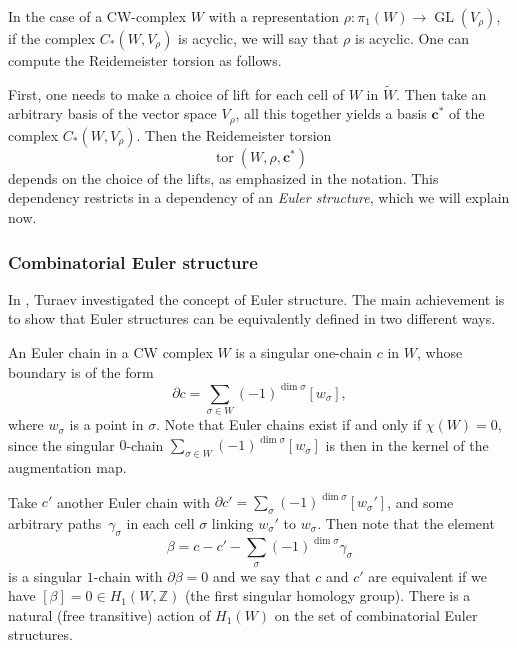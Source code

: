 \documentclass[JEP,XML,SOM,Unicode,NoFloatCountersInSection,published]{cedram}
\theoremstyle{plain}
\theoremstyle{definition}
\theoremstyle{remark}
\newcommand{\Z}{\mathbb{Z}}
\DeclareMathOperator{\GL}{GL}
\numberwithin{equation}{section}
\DeclareMathOperator{\tor}{tor}
\begin{document}
In the case of a CW-complex $W$ with a representation $\rho \colon \pi_1(W) \to \GL(V_\rho)$, if the complex $C_*(W, V_\rho)$ is acyclic, we will say that $\rho$ is acyclic. One can compute the Reidemeister torsion as follows.\par
First, one needs to make a choice of lift for each cell of $W$ in $\widetilde W$. Then take an arbitrary basis of the vector space $V_\rho$, all this together yields a basis $\boldsymbol c^\ast$ of the complex $C_*(W, V_\rho)$. Then the Reidemeister torsion
\[
\tor(W, \rho, \boldsymbol c^*)
\]
depends on the choice of the lifts, as emphasized in the notation. This dependency restricts in a dependency of an \emph{Euler structure}, which we will explain now.

\label{subsec:Euler}
\subsubsection{Combinatorial Euler structure}
In \cite{Turaev}, Turaev investigated the concept of Euler structure. The main achievement is to show that Euler structures can be equivalently defined in two different ways.

An Euler chain in a CW complex $W$ is a singular one-chain $c$ in $W$, whose boundary is of the form
\[
\partial c = \sum_{\sigma \in W} (-1)^{\dim \sigma} [w_\sigma],
\]
where $w_\sigma$ is a point in $\sigma$. Note that Euler chains exist if and only if $\chi(W) = 0$, since the singular $0$-chain $\sum_{\sigma \in W} (-1)^{\dim \sigma} [w_\sigma]$ is then in the kernel of the augmentation map.

Take $c'$ another Euler chain with $\partial c'= \sum_\sigma (-1)^{\dim\sigma}[w_\sigma']$, and some arbitrary paths~$\gamma_\sigma$ in each cell $\sigma$ linking $w_\sigma'$ to $w_\sigma$. Then note that the element
\[
\beta = c - c' - \sum_\sigma(-1)^{\dim\sigma}\gamma_\sigma
\]
is a singular $1$-chain with $\partial\beta = 0$ and we say that $c$ and $c'$ are equivalent if we have $[\beta] = 0 \in H_1(W,\Z)$ (the first singular homology group). There is a natural (free transitive) action of $H_1(W)$ on the set of combinatorial Euler structures.
\end{document}
